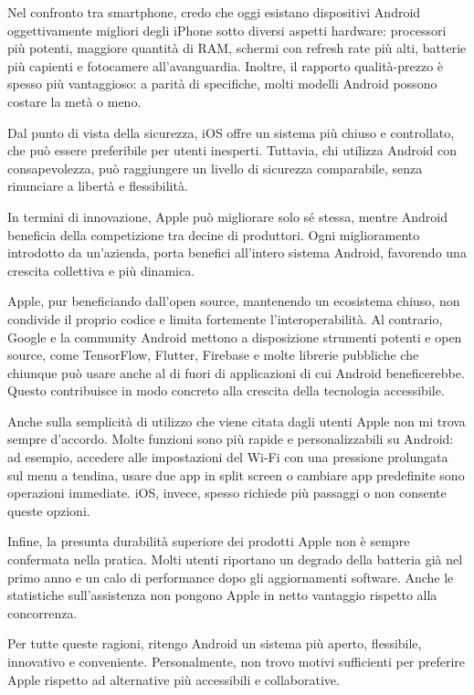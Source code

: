 \documentclass[12pt]{book} %
\begin{document}
\begin{mdframed}[linewidth=1pt]
Nel confronto tra smartphone, credo che oggi esistano dispositivi Android oggettivamente migliori degli iPhone sotto diversi aspetti hardware: processori più potenti, maggiore quantità di RAM, schermi con refresh rate più alti, batterie più capienti e fotocamere all’avanguardia. Inoltre, il rapporto qualità-prezzo è spesso più vantaggioso: a parità di specifiche, molti modelli Android possono costare la metà o meno.

Dal punto di vista della sicurezza, iOS offre un sistema più chiuso e controllato, che può essere preferibile per utenti inesperti. Tuttavia, chi utilizza Android con consapevolezza, può raggiungere un livello di sicurezza comparabile, senza rinunciare a libertà e flessibilità.

In termini di innovazione, Apple può migliorare solo sé stessa, mentre Android beneficia della competizione tra decine di produttori. Ogni miglioramento introdotto da un’azienda, porta benefici all’intero sistema Android, favorendo una crescita collettiva e più dinamica.

Apple, pur beneficiando dall'open source, mantenendo un ecosistema chiuso, non condivide il proprio codice e limita fortemente l’interoperabilità. Al contrario, Google e la community Android mettono a disposizione strumenti potenti e open source, come TensorFlow, Flutter, Firebase e molte librerie pubbliche che chiunque può usare anche al di fuori di applicazioni di cui Android beneficerebbe. Questo contribuisce in modo concreto alla crescita della tecnologia accessibile.

Anche sulla semplicità di utilizzo che viene citata dagli utenti Apple non mi trova sempre d'accordo. Molte funzioni sono più rapide e personalizzabili su Android: ad esempio, accedere alle impostazioni del Wi-Fi con una pressione prolungata sul menu a tendina, usare due app in split screen o cambiare app predefinite sono operazioni immediate. iOS, invece, spesso richiede più passaggi o non consente queste opzioni.

Infine, la presunta durabilità superiore dei prodotti Apple non è sempre confermata nella pratica. Molti utenti riportano un degrado della batteria già nel primo anno e un calo di performance dopo gli aggiornamenti software. Anche le statistiche sull’assistenza non pongono Apple in netto vantaggio rispetto alla concorrenza.

Per tutte queste ragioni, ritengo Android un sistema più aperto, flessibile, innovativo e conveniente. Personalmente, non trovo motivi sufficienti per preferire Apple rispetto ad alternative più accessibili e collaborative.
\end{mdframed}
\end{document}
